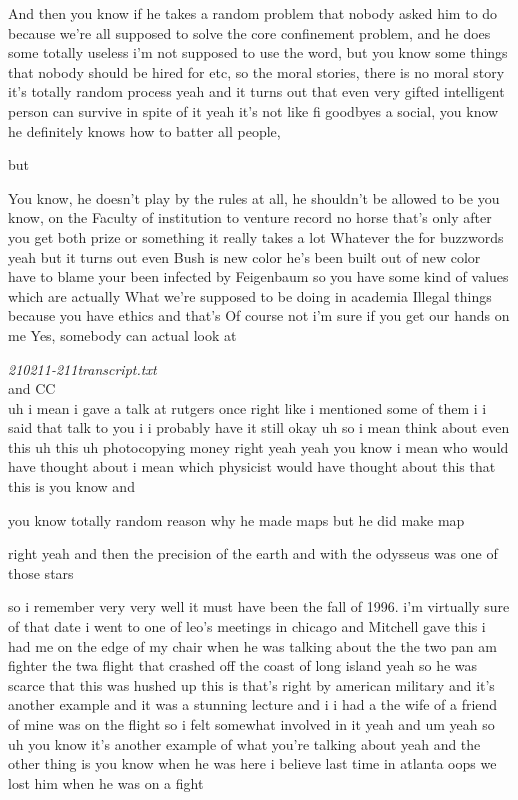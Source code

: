 \begin{description}
And then you know if he takes a random problem that nobody asked
him to do because we're all supposed to solve the core confinement
problem, and he does some totally useless i'm not supposed to use
the word, but you know some things that nobody should be hired for
etc, so the moral stories, there is no moral story it's totally
random process yeah and it turns out that even very gifted
intelligent person can survive in spite of it yeah it's not like fi
goodbyes a social, you know he definitely knows how to batter all
people,

but

You know, he doesn't play by the rules at all, he shouldn't be
allowed to be you know, on the Faculty of institution to venture
record no horse that's only after you get both prize or something
it really takes a lot Whatever the for buzzwords yeah but it turns
out even Bush is new color he's been built out of new color have to
blame your been infected by Feigenbaum so you have some kind of
values which are actually What we're supposed to be doing in
academia Illegal things because you have ethics and that's Of
course not i'm sure if you get our hands on me Yes, somebody can
actual look at

\emph{210211-211transcript.txt}\\
and
 {CC}\\

uh i mean i gave a talk at rutgers once right like i mentioned some of
them i i said that talk to you i i probably have it still okay uh so i
mean think about even this uh this uh photocopying money right yeah yeah
you know i mean who would have thought about i mean which physicist would
have thought about this that this is you know and

you know totally random
reason why he made maps but he did make map

right yeah and then the
precision of the earth and with the odysseus was one of those stars

so i remember very very well it must have been the fall of 1996. i'm
virtually sure of that date i went to one of leo's meetings in chicago
and Mitchell gave this i had me on the edge of my chair when he was
talking about the the two pan am fighter the twa flight that crashed off
the coast of long island yeah so he was scarce that this was hushed up
this is that's right by american military and it's another example and it
was a stunning lecture and i i had a the wife of a friend of mine was on
the flight so i felt somewhat involved in it yeah and um yeah so uh you
know it's another example of what you're talking about yeah and the other
thing is you know when he was here i believe last time in atlanta oops we
lost him when he was on a fight


\end{description}
